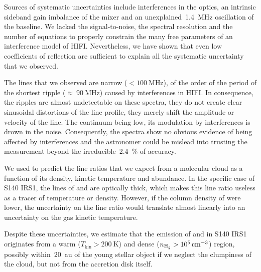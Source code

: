 Sources of systematic uncertainties include
interferences in the optics,
an intrinsic sideband gain imbalance of the mixer
and an unexplained~\SI{1.4}{\mega\hertz} oscillation of the baseline.
We lacked the signal-to-noise, the spectral resolution and the number of equations to properly constrain the many free parameters of an interference model of HIFI.
Nevertheless, we have shown that even low coefficients of reflection are sufficient to explain all the systematic uncertainty that we observed.

The lines that we observed are narrow ($< \SI{100}{\mega\hertz}$), of the order of the period of the shortest ripple ($\approx~\SI{90}{\mega\hertz}$) caused by interferences in HIFI.
In consequence, the ripples are almost undetectable on these spectra, they do not create clear sinusoidal distortions of the line profile, they merely shift the amplitude or velocity of the line.
The continuum being low, its modulation by interferences is drown in the noise.
Consequently, the spectra show no obvious evidence of being affected by interferences
and the astronomer could be mislead into trusting the measurement beyond the irreducible~\SI{2.4}{\percent} of accuracy.

We used \radex{} to predict the line ratios that we expect from a molecular cloud as a function of its density, kinetic temperature and  abundance.
In the specific case of S140 IRS1, the lines of  and  are optically thick, which makes this line ratio useless as a tracer of temperature or density.
However, if the column density of  were lower, the uncertainty on the line ratio would translate almost linearly into an uncertainty on the gas kinetic temperature.

Despite these uncertainties, we estimate that the emission of  and  in S140 IRS1 originates from a warm ($T_\text{kin}> \SI{200}{\kelvin}$) and dense ($n_\text{\ce{H2}} > \SI{e5}{\per\centi\meter\cubed}$) region,
possibly within~\SI{20}{\astronomicalunit} of the young stellar object if we neglect the clumpiness of the cloud, but not from the accretion disk itself.




